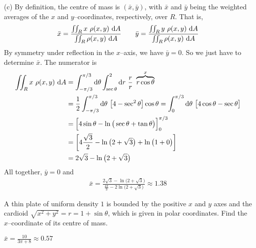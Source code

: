 \begin{solution}
(c)
By definition, the centre of mass is $(\bar x, \bar y)$,
with $\bar x$ and $\bar y$ being the weighted averages  of the $x$ and 
$y$--coordinates, respectively, over $R$. That is,
\begin{align*}
\bar x = \frac{\dblInt_R x\ \rho(x,y)\ \dee{A}}{\dblInt_R \rho(x,y)\ \dee{A}}
\qquad
\bar y = \frac{\dblInt_R y\ \rho(x,y)\ \dee{A}}{\dblInt_R \rho(x,y)\ \dee{A}}
\end{align*}
By symmetry under reflection in the $x$--axis, we have $\bar y=0$.
So we just have to determine $\bar x$. 
The numerator is
\begin{align*}
\dblInt_R x\ \rho(x,y)\ \dee{A}
&=\int_{-\pi/3}^{\pi/3}\dee{\theta}\int_{\sec\theta}^2\dee{r}\ \frac{r}{r}\ 
       \overbrace{r\cos\theta}^{x} \\
&=\frac{1}{2}\int_{-\pi/3}^{\pi/3}\dee{\theta}\ \big[4-\sec^2\theta\big]
                               \cos\theta 
=\int_0^{\pi/3}\dee{\theta}\ \big[4\cos\theta-\sec\theta\big] \\
&= \Big[4\sin\theta - \ln\big(\sec\theta+\tan\theta\big)\Big]_0^{\pi/3} \\
&= \left[4\frac{\sqrt{3}}{2} - \ln\big(2+\sqrt{3}\big)
            + \ln\big(1+0\big)\right] \\
&=  2\sqrt{3}- \ln\big(2+\sqrt{3}\big)
\end{align*}
All together, $\bar y=0$ and
\begin{align*}
\bar x = \frac{2\sqrt{3}- \ln\big(2+\sqrt{3}\big)}
            {\frac{4\pi}{3} - 2\ln\big(2+\sqrt{3}\big)}
        \approx 1.38
\end{align*}
\end{solution}

\begin{question}[M200 2009D] %
A thin plate of uniform density $1$ is bounded by the positive $x$ and $y$ 
axes and the cardioid $\sqrt{x^2+y^2}=r=1+\sin\theta$, which is given
in polar coordinates. Find the $x$--coordinate of its centre of mass.
\end{question}

%

\begin{answer}
$\bar x = \frac{10}{3\pi+8} \approx 0.57$
\end{answer}

